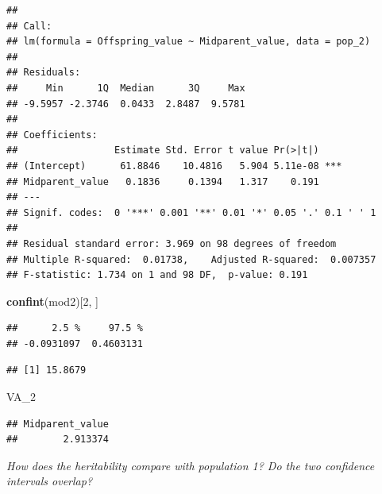 \documentclass[
  a4paper]{book}
\newenvironment{Shaded}{\begin{snugshade}}{\end{snugshade}}
\newcommand{\DecValTok}[1]{\textcolor[rgb]{0.00,0.00,0.81}{#1}}
\newcommand{\FunctionTok}[1]{\textcolor[rgb]{0.13,0.29,0.53}{\textbf{#1}}}
\newcommand{\NormalTok}[1]{#1}
\newcommand{\OtherTok}[1]{\textcolor[rgb]{0.56,0.35,0.01}{#1}}
\newcommand{\SpecialCharTok}[1]{\textcolor[rgb]{0.81,0.36,0.00}{\textbf{#1}}}
\begin{document}
\begin{verbatim}
## 
## Call:
## lm(formula = Offspring_value ~ Midparent_value, data = pop_2)
## 
## Residuals:
##     Min      1Q  Median      3Q     Max 
## -9.5957 -2.3746  0.0433  2.8487  9.5781 
## 
## Coefficients:
##                 Estimate Std. Error t value Pr(>|t|)    
## (Intercept)      61.8846    10.4816   5.904 5.11e-08 ***
## Midparent_value   0.1836     0.1394   1.317    0.191    
## ---
## Signif. codes:  0 '***' 0.001 '**' 0.01 '*' 0.05 '.' 0.1 ' ' 1
## 
## Residual standard error: 3.969 on 98 degrees of freedom
## Multiple R-squared:  0.01738,    Adjusted R-squared:  0.007357 
## F-statistic: 1.734 on 1 and 98 DF,  p-value: 0.191
\end{verbatim}

\begin{Shaded}
\begin{Highlighting}[]
\FunctionTok{confint}\NormalTok{(mod2)[}\DecValTok{2}\NormalTok{, ]}
\end{Highlighting}
\end{Shaded}

\begin{verbatim}
##      2.5 %     97.5 % 
## -0.0931097  0.4603131
\end{verbatim}

\begin{Shaded}
\end{Shaded}

\begin{verbatim}
## [1] 15.8679
\end{verbatim}

\begin{Shaded}
\begin{Highlighting}[]
\NormalTok{VA\_2}
\end{Highlighting}
\end{Shaded}

\begin{verbatim}
## Midparent_value 
##        2.913374
\end{verbatim}

\emph{How does the heritability compare with population 1? Do the two confidence intervals overlap?}
\end{document}
